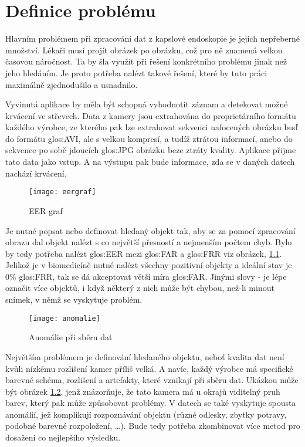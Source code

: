 \chapter{Definice problému}
Hlavním problémem při zpracování dat z kapslové endoskopie je jejich nepřeberné množství. Lékaři musí projít obrázek po obrázku, což pro ně znamená velkou časovou náročnost. Ta by šla využít při řešení konkrétního problému jinak než jeho hledáním. Je proto potřeba nalézt takové řešení, které by tuto práci maximálně zjednodušilo a usnadnilo.

Vyvinutá aplikace by měla být schopná vyhodnotit záznam a detekovat možné krvácení ve střevech. Data z kamery jsou extrahována do proprietárního formátu každého výrobce, ze kterého pak lze extrahovat sekvenci nafocených obrázku buď do formátu \gls{glos:AVI}, ale s velkou kompresí, a tudíž ztrátou informací, anebo do sekvence po sobě jdoucích \gls{glos:JPG} obrázku beze ztráty kvality. Aplikace přijme tato data jako vstup. A na výstupu pak bude informace, zda se v daných datech nachází krvácení. 

\begin{figure}[h]
	\texttt{[image: eergraf]}
	\centering
	\caption{EER graf \cite{gumption:}\label{fig:eergraf}}
\end{figure}

Je nutné popsat nebo definovat hledaný objekt tak, aby se za pomocí zpracování obrazu dal objekt nalézt s co největší přesností a nejmenším počtem chyb. Bylo by tedy potřeba nalézt \gls{glos:EER} mezi \gls{glos:FAR} a \gls{glos:FRR} viz obrázek, \ref{fig:eergraf}. Jelikož je v biomedicíně nutné nalézt všechny pozitivní objekty a ideální stav je 0\% \gls{glos:FRR}, tak se dá akceptovat větší míra \gls{glos:FAR}. Jinými slovy - je lépe označit více objektů, i když některý z nich může být chybou, než-li minout snímek, v němž se vyskytuje problém.

\begin{figure}[h]
	\texttt{[image: anomalie]}
	\centering
	\caption{Anomálie při sběru dat \label{fig:anomalie}}
\end{figure} 

Největším problémem je definování hledaného objektu, neboť kvalita dat není kvůli nízkému rozlišení kamer příliš velká. A navíc, každý výrobce má specifické barevné schéma, rozlišení a artefakty, které vznikají při sběru dat. Ukázkou může být obrázek \ref{fig:anomalie}, jenž znázorňuje, že tato kamera má u okrajů viditelný pruh barev, který pak může způsobovat problémy. V datech se také vyskytuje spousta anomálií, jež komplikují rozpoznávání objektu (různé odlesky, zbytky potravy, podobné barevné rozpoložení, …). Bude tedy potřeba zkombinovat více metod pro dosažení co nejlepšího výsledku.


